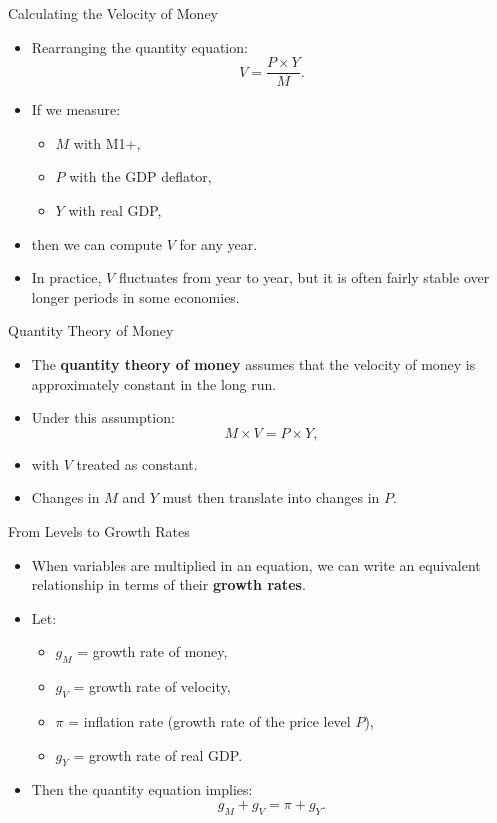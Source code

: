 \documentclass[aspectratio=169]{beamer}
\begin{document}
\begin{frame}{Calculating the Velocity of Money}
\transfade
\begin{itemize}[<+->]
  \item Rearranging the quantity equation:
  \[
    V = \frac{P \times Y}{M}.
  \]
  \item If we measure:
  \begin{itemize}[<+->]
    \item \(M\) with M1+,
    \item \(P\) with the GDP deflator,
    \item \(Y\) with real GDP,
  \end{itemize}
  \item then we can compute \(V\) for any year.
  \item In practice, \(V\) fluctuates from year to year, but it is often fairly stable over longer periods in some economies.
\end{itemize}
\end{frame}

\begin{frame}{Quantity Theory of Money}
\transfade
\begin{itemize}[<+->]
  \item The \textbf{quantity theory of money} assumes that the velocity of money is approximately constant in the long run.
  \item Under this assumption:
  \[
    M \times V = P \times Y,
  \]
  \item with \(V\) treated as constant.
  \item Changes in \(M\) and \(Y\) must then translate into changes in \(P\).
\end{itemize}
\end{frame}

\begin{frame}{From Levels to Growth Rates}
\transfade
\begin{itemize}[<+->]
  \item When variables are multiplied in an equation, we can write an equivalent relationship in terms of their \textbf{growth rates}.
  \item Let:
  \begin{itemize}[<+->]
    \item \(g_{M}\) = growth rate of money,
    \item \(g_{V}\) = growth rate of velocity,
    \item \(\pi\) = inflation rate (growth rate of the price level \(P\)),
    \item \(g_{Y}\) = growth rate of real GDP.
  \end{itemize}
  \item Then the quantity equation implies:
  \[
    g_{M} + g_{V} = \pi + g_{Y}.
  \]
\end{itemize}
\end{frame}
\end{document}
